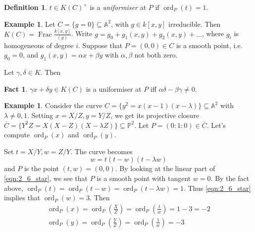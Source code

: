 \documentclass[11pt]{article}
\theoremstyle{definition}
\newtheorem*{definition*}{Definition}
\newtheorem{example}[definition]{Example}
\newtheorem*{fact}{Fact}
\theoremstyle{plain}
\theoremstyle{remark}
\DeclareMathOperator{\ord}{ord}
\DeclareMathOperator{\Frac}{Frac}
\newcommand{\PP}{\mathbb{P}}
\newcommand{\bA}{\mathbb{A}}
\begin{document}
\begin{definition*}
    $t \in K(C)^\times$ is a \emph{uniformiser} at $P$ if $\ord_P(t) = 1$.
\end{definition*}

\begin{example}\label{eg:2_5}
    Let $C = \{g = 0\} \subseteq \bA^2$, with $g \in k[x,y]$ irreducible. Then $K(C) = \Frac \frac{k[x,y]}{(g)}$. Write $g = g_0 + g_1(x,y) + g_2(x,y) + \ldots$, where $g_i$ is homogeneous of degree $i$. Suppose that $P = (0, 0) \in C$ is a smooth point, i.e. $g_0 = 0$, and $g_1(x,y) = \alpha x + \beta y$ with $\alpha, \beta$ not both zero.
    \begin{figure}[htpb]
    \centering
    \end{figure}
    
    Let $\gamma, \delta \in K$. Then

    \begin{fact}
        $\gamma x + \delta y \in K(C)$ is a uniformiser at $P$ iff $\alpha \delta - \beta \gamma \neq 0$.
    \end{fact}
\end{example}

\begin{example}\label{eg:2_6}
    Consider the curve $C = \{y^2 = x(x-1)(x-\lambda)\} \subseteq \bA^2$ with $\lambda \neq 0, 1$. Setting $x=X/Z, y=Y/Z$, we get its projective closure $\overline{C} = \{Y^2 Z = X (X-Z) (X-\lambda Z)\} \subseteq \PP^2$. Let $P = (0 : 1 : 0) \in \overline{C}$. Let's compute $\ord_P(x)$ and $\ord_P(y)$.

    Set $t=X/Y, w=Z/Y$. The curve becomes
    \begin{equation}\label{eqn:2_6_star}
        w = t(t-w)(t-\lambda w)
    \end{equation}
    and $P$ is the point $(t,w)=(0,0)$. By looking at the linear part of \eqref{eqn:2_6_star}, we see that $P$ is a smooth point with tangent $w = 0$. By the fact above, $\ord_P(t)=\ord_P(t-w)=\ord_P(t-\lambda w)=1$. Thus \eqref{eqn:2_6_star} implies that $\ord_P(w) = 3$. Then
    \begin{gather*}
        \ord_P(x) = \ord_P\left(\frac{X}{Z}\right) = \ord_P\left(\frac{t}{w}\right) = 1-3 = -2\\
        \ord_P(y) = \ord_P\left(\frac{Y}{Z}\right) = \ord_P\left(\frac{1}{w}\right) = -3
    \end{gather*}
\end{example}
\end{document}
